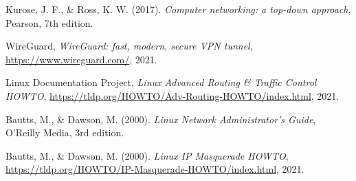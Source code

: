 
%



\begin{thebibliography}{9}
  Kurose, J. F., \& Ross, K. W. (2017).
  \emph{Computer networking: a top-down approach},
  Pearson,
  7th edition.

    WireGuard,
    \emph{WireGuard: fast, modern, secure VPN tunnel},
    \url{https://www.wireguard.com/},
    2021.

    Linux Documentation Project,
    \emph{Linux Advanced Routing \& Traffic Control HOWTO},
    \url{https://tldp.org/HOWTO/Adv-Routing-HOWTO/index.html},
    2021.

    Bautts, M., \& Dawson, M. (2000).
    \emph{Linux Network Administrator's Guide},
    O'Reilly Media,
    3rd edition.


    Bautts, M., \& Dawson, M. (2000).
    \emph{Linux IP Masquerade HOWTO},
    \url{https://tldp.org/HOWTO/IP-Masquerade-HOWTO/index.html},
    2021.

\end{thebibliography}